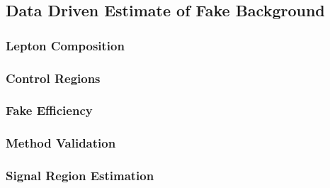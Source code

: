 \subsection{Data Driven Estimate of Fake Background}
\label{subsec:FakeBackground}

\subsubsection{Lepton Composition}
\label{subsubsec:LepComp}

\subsubsection{Control Regions}
\label{subsubsec:CR}

\subsubsection{Fake Efficiency}
\label{subsubsec:FakeEff}

\subsubsection{Method Validation}
\label{subsubsec:Validation}

\subsubsection{Signal Region Estimation}
\label{subsubsec:SREstimation}